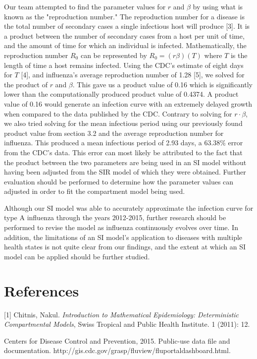 \documentclass[11pt, oneside]{article}   	%
\begin{document}
Our team attempted to find the parameter values for $r$ and $\beta$ by using what is known as the "reproduction number." The reproduction number for a disease is the total number of secondary cases a single infectious host will produce [3]. It is a product between the number of secondary cases from a host per unit of time, and the amount of time for which an individual is infected. Mathematically, the reproduction number $R_0$ can be represented by $R_0 = (r\beta)(T)$ where $T$ is the length of time a host remains infected. Using the CDC's estimate of eight days for $T$ [4], and influenza's average reproduction number of 1.28 [5], we solved for the product of $r$ and $\beta$. This gave us a product value of 0.16 which is significantly lower than the computationally produced product value of 0.4374. A product value of 0.16 would generate an infection curve with an extremely delayed growth when compared to the data published by the CDC. Contrary to solving for $r \cdot \beta$, we also tried solving for the mean infectious period using our previously found product value from section 3.2 and the average reproduction number for influenza. This produced a mean infectious period of 2.93 days, a 63.38\% error from the CDC's data. This error can most likely be attributed to the fact that the product between the two parameters are being used in an SI model without having been adjusted from the SIR model of which they were obtained. Further evaluation should be performed to determine how the parameter values can adjusted in order to fit the compartment model being used.

Although our SI model was able to accurately approximate the infection curve for type A influenza through the years 2012-2015, further research should be performed to revise the model as influenza continuously evolves over time. In addition, the limitations of an SI model's application to diseases with multiple health states is not quite clear from our findings, and the extent at which an SI model can be applied should be further studied. 


\section{References}
[1] Chitnis, Nakul. \textit{Introduction to Mathematical Epidemiology: Deterministic Compartmental Models}, Swiss Tropical and Public Health Institute. 1 (2011): 12.

\bigskip

\noindent[2] Centers for Disease Control and Prevention, 2015. Public-use data file and documentation. http://gis.cdc.gov/grasp/fluview/fluportaldashboard.html.
\end{document}
